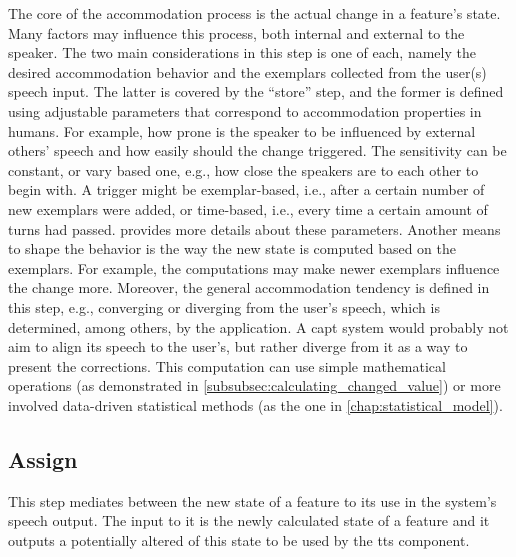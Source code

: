 The core of the accommodation process is the actual change in a feature's state.
Many factors may influence this process, both internal and external to the speaker.
The two main considerations in this step is one of each, namely the desired accommodation behavior and the exemplars collected from the user(s) speech input.
The latter is covered by the \enquote{store} step, and the former is defined using adjustable parameters that correspond to accommodation properties in humans.
For example, how prone is the speaker to be influenced by external others' speech and how easily should the change triggered.
The sensitivity can be constant, or vary based one, e.g., how close the speakers are to each other to begin with.
A trigger might be exemplar-based, i.e., after a certain number of new exemplars were added, or time-based, i.e., every time a certain amount of turns had passed.
 provides more details about these parameters.
Another means to shape the behavior is the way the new state is computed based on the exemplars.
For example, the computations may make newer exemplars influence the change more.
Moreover, the general accommodation tendency is defined in this step, e.g., converging or diverging from the user's speech, which is determined, among others, by the application.
A \ac{capt} system would probably not aim to align its speech to the user's, but rather diverge from it as a way to present the corrections.
This computation can use simple mathematical operations (as demonstrated in \cref{subsubsec:calculating_changed_value}) or more involved data-driven statistical methods (as the one in \cref{chap:statistical_model}).

\subsection{Assign}
\label{subsec:assign}

This step mediates between the new state of a feature to its use in the system's speech output.
The input to it is the newly calculated state of a feature and it outputs a potentially altered of this state to be used by the \ac{tts} component.

